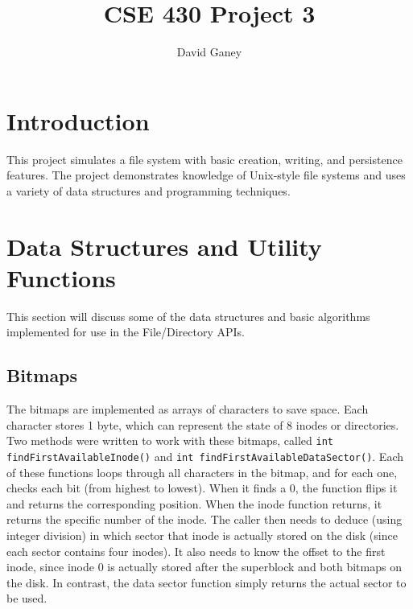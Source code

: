 \documentclass[]{article}
\begin{document}
\lstset{language=C++}

\begin{spacing}{.4}
\setlength{\droptitle}{-7em}
\title{CSE 430 Project 3}
\author{David Ganey}
\maketitle
\end{spacing}

\section{Introduction}
This project simulates a file system with basic creation, writing, and persistence features. The project demonstrates knowledge of Unix-style file systems and uses a variety of data structures and programming techniques.

\section{Data Structures and Utility Functions}
This section will discuss some of the data structures and basic algorithms implemented for use in the File/Directory APIs.

\subsection{Bitmaps}
The bitmaps are implemented as arrays of characters to save space. Each character stores 1 byte, which can represent the state of 8 inodes or directories. Two methods were written to work with these bitmaps, called \texttt{int findFirstAvailableInode()} and \texttt{int findFirstAvailableDataSector()}. Each of these functions loops through all characters in the bitmap, and for each one, checks each bit (from highest to lowest). When it finds a 0, the function flips it and returns the corresponding position. When the inode function returns, it returns the specific number of the inode. The caller then needs to deduce (using integer division) in which sector that inode is actually stored on the disk (since each sector contains four inodes). It also needs to know the offset to the first inode, since inode 0 is actually stored after the superblock and both bitmaps on the disk. In contrast, the data sector function simply returns the actual sector to be used.
\end{document}
